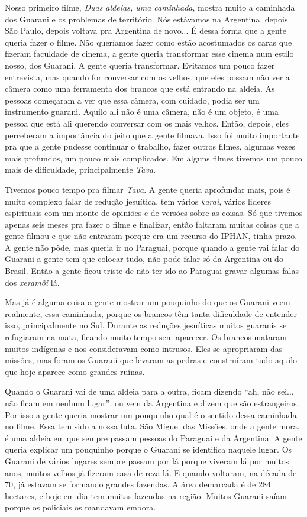 Nosso primeiro filme, \emph{Duas aldeias, uma caminhada}, mostra muito a
caminhada dos Guarani e os problemas de território. Nós estávamos na
Argentina, depois São Paulo, depois voltava pra Argentina de novo... É
dessa forma que a gente queria fazer o filme. Não queríamos fazer como
estão acostumados os caras que fizeram faculdade de cinema, a gente
queria transformar esse cinema num estilo nosso, dos Guarani. A gente
queria transformar. Evitamos um pouco fazer entrevista, mas quando for
conversar com os velhos, que eles possam não ver a câmera como uma
ferramenta dos brancos que está entrando na aldeia. As pessoas começaram
a ver que essa câmera, com cuidado, podia ser um instrumento guarani.
Aquilo ali não é uma câmera, não é um objeto, é uma pessoa que está ali
querendo conversar com os mais velhos. Então, depois, eles perceberam a
importância do jeito que a gente filmava. Isso foi muito importante pra
que a gente pudesse continuar o trabalho, fazer outros filmes, algumas
vezes mais profundos, um pouco mais complicados. Em alguns filmes
tivemos um pouco mais de dificuldade, principalmente \emph{Tava}.

Tivemos pouco tempo pra filmar \emph{Tava}. A gente queria aprofundar
mais, pois é muito complexo falar de redução jesuítica, tem vários
\emph{karai}, vários lideres espirituais com um monte de opiniões e de
versões sobre as coisas. Só que tivemos apenas seis meses pra fazer o
filme e finalizar, então faltaram muitas coisas que a gente filmou e que
não entraram porque era um recurso do IPHAN, tinha prazo. A gente não
pôde, mas queria ir no Paraguai, porque quando a gente vai falar do
Guarani a gente tem que colocar tudo, não pode falar só da Argentina ou
do Brasil. Então a gente ficou triste de não ter ido ao Paraguai gravar
algumas falas dos \emph{xeramõi} lá.

Mas já é alguma coisa a gente mostrar um pouquinho do que os Guarani
veem realmente, essa caminhada, porque os brancos têm tanta dificuldade
de entender isso, principalmente no Sul. Durante as reduções jesuíticas
muitos guaranis se refugiaram na mata, ficando muito tempo sem aparecer.
Os brancos mataram muitos indígenas e nos consideravam como intrusos.
Eles se apropriaram das missões, mas foram os Guarani que levaram as
pedras e construíram tudo aquilo que hoje aparece como grandes ruínas.

Quando o Guarani vai de uma aldeia para a outra, ficam dizendo ``ah, não
sei... não ficam em nenhum lugar'', ou vem da Argentina e dizem que são
estrangeiros. Por isso a gente queria mostrar um pouquinho qual é o
sentido dessa caminhada no filme. Essa tem sido a nossa luta. São Miguel
das Missões, onde a gente mora, é uma aldeia em que sempre passam
pessoas do Paraguai e da Argentina. A gente queria explicar um pouquinho
porque o Guarani se identifica naquele lugar. Os Guarani de vários
lugares sempre passam por lá porque viveram lá por muitos anos, muitos
velhos já fizeram casa de reza lá. E quando voltaram, na década de 70,
já estavam se formando grandes fazendas. A área demarcada é de 284
hectares, e hoje em dia tem muitas fazendas na região. Muitos Guarani
saíam porque os policiais os mandavam embora.

